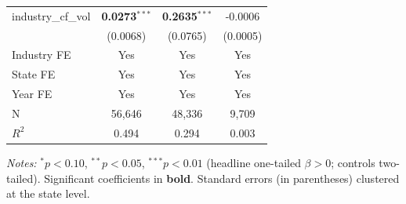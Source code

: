 \begin{table}[H]
\begin{tabular}{lccc}
industry\_cf\_vol & \textbf{0.0273}$^{***}$ & \textbf{0.2635}$^{***}$ & -0.0006 \\
 & (0.0068) & (0.0765) & (0.0005) \\
\midrule
Industry FE & Yes & Yes & Yes \\
State FE & Yes & Yes & Yes \\
Year FE & Yes & Yes & Yes \\
\midrule
N & 56,646 & 48,336 & 9,709 \\
$R^2$ & 0.494 & 0.294 & 0.003 \\
\bottomrule
\end{tabular}
\begin{minipage}{\linewidth}
\vspace{2pt}\footnotesize
\textit{Notes:} $^{*}p<0.10$, $^{**}p<0.05$, $^{***}p<0.01$ (headline one-tailed $\beta>0$; controls two-tailed). Significant coefficients in \textbf{bold}. Standard errors (in parentheses) clustered at the state level.
\end{minipage}
\end{table}
